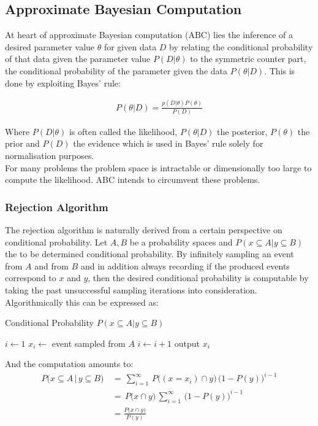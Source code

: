 \documentclass[a4paper, 11pt]{article}
\begin{document}
\subsection{Approximate Bayesian Computation}

At heart of approximate Bayesian computation (ABC) lies the inference of a desired parameter value $\theta$ for given data $D$ by relating the conditional probability of that data given the parameter value $P(D | \theta)$ to the symmetric counter part, the conditional probability of the parameter given the data $P(\theta | D)$. This is done by exploiting Bayes' rule:

\begin{align*}
P(\theta | D) = \frac{p(D | \theta) P(\theta)}{P(D)}
\end{align*}

Where $P(D | \theta)$ is often called the likelihood, $P(\theta | D)$ the posterior, $P(\theta)$ the prior and $P(D)$ the evidence which is used in Bayes' rule solely for normalisation purposes. \\
For many problems the problem space is intractable or dimensionally too large to compute the likelihood. ABC intends to circumvent these problems.

\subsubsection{Rejection Algorithm}
The rejection algorithm is naturally derived from a certain perspective on conditional probability. Let $A, B$ be a probability spaces and $P(x \subseteq A|y \subseteq B)$ the to be determined conditional probability. By infinitely sampling an event from $A$ and from $B$ and in addition always recording if the produced events correspond to $x$ and $y$, then the desired conditional probability is computable by taking the past unsuccessful sampling iterations into consideration. Algorithmically this can be expressed as:

\begin{algorithm}
\caption{Conditional Probability $P(x \subseteq A|y \subseteq B)$}\label{euclid}
\begin{algorithmic}[1]
\State $i \gets 1$
\For {$\infty$}
\Repeat
\State $x_i \gets$ event sampled from $A$
\State $i \gets i + 1$
\State output $x_i$
\EndFor
\end{algorithmic}
\end{algorithm}

And the computation amounts to:
\begin{align*}
P\big(x \subseteq A\, |\, y \subseteq B \big)\, &=\, \sum^{\infty}_{i=1}\, P\big((x = x_i) \cap y\big)\, \big(1-P(y)\big)^{i-1} \\
&=\, P\big(x \cap y\big)\,  \sum^{\infty}_{i=1}\, \big(1-P(y)\big)^{i-1} \\
&= \frac{P\big(x \cap y\big)}{P(y)}
\end{align*}
\end{document}

